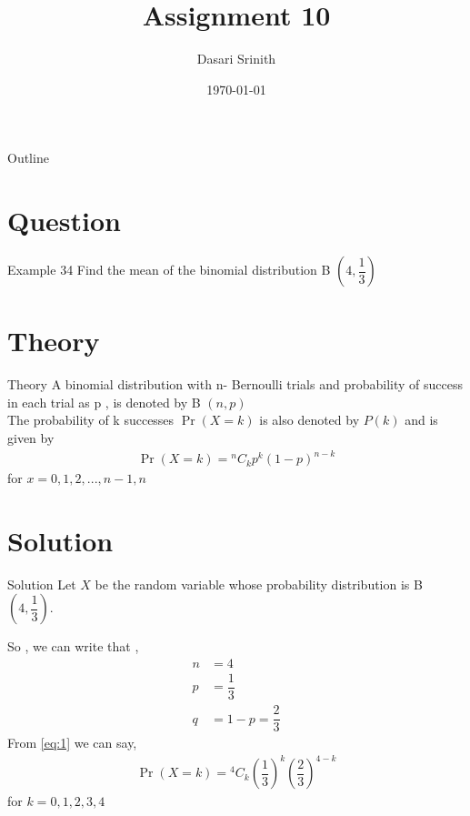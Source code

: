 \documentclass{beamer}
\title{Assignment 10}
\author{Dasari Srinith}
\date{\today}
\providecommand{\pr}[1]{\ensuremath{\Pr\left(#1\right)}}
\newcommand*{\Comb}[2]{{}^{#1}C_{#2}}
\providecommand{\brak}[1]{\ensuremath{\left(#1\right)}}
\begin{document}
    \begin{frame}
        \titlepage 
    \end{frame}

    \begin{frame}{Outline}
        \tableofcontents
    \end{frame}

    \section{Question}
    	\begin{frame}{Example 34}
    	Find the mean of the binomial distribution B \brak{4,\dfrac{1}{3}}
    	\end{frame}

    \section{Theory}
        \begin{frame}{Theory}
        A binomial distribution with n- Bernoulli trials and probability of success in each trial as p , is denoted by B \brak{n,p}
        \\\vspace{0.5cm}
        The probability of k successes $\pr{X = k}$ is also denoted by $P(k)$ and is given by 
            \begin{align}
                \pr{X = k} = \Comb{n}{k} p^k\brak{1-p}^{n-k}
                \label{eq:1}
            \end{align}
            for $x = 0,1,2,...,n-1,n$ 
        \end{frame}
    
    \section{Solution}
    \begin{frame}{Solution}
    Let $X$ be the random variable whose probability distribution is B \brak{4,\dfrac{1}{3}}.
    
    So , we can write that ,
    \begin{align}
        n &=4 \\
        p &= \dfrac{1}{3} \\
        q &= 1- p = \dfrac{2}{3}
    \end{align}
    From \eqref{eq:1} we can say,
    \begin{align}
        \pr{X = k} = \Comb{4}{k} \brak{\dfrac{1}{3}}^k\brak{\dfrac{2}{3}}^{4-k}
    \end{align}
    for $k = 0,1,2,3,4$
    \end{frame}
    
\end{document}
